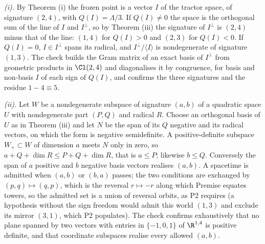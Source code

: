 \emph{(i).} By Theorem (i) the frozen point is a vector $I$ of the tractor space, of signature $(2,4)$, with $Q(I) = \Lambda/3$. If $Q(I) \neq 0$ the space is the orthogonal sum of the line of $I$ and $I^{\perp}$, so by Theorem (iii) the signature of $I^{\perp}$ is $(2,4)$ minus that of the line: $(1,4)$ for $Q(I) > 0$ and $(2,3)$ for $Q(I) < 0$. If $Q(I) = 0$, $I \in I^{\perp}$ spans its radical, and $I^{\perp}/\langle I\rangle$ is nondegenerate of signature $(1,3)$. The check builds the Gram matrix of an exact basis of $I^{\perp}$ from geometric products in $\Cl(2,4)$ and diagonalises it by congruence, for basis and non-basis $I$ of each sign of $Q(I)$, and confirms the three signatures and the residue $1 - 4 \equiv 5$.

\emph{(ii).} Let $W$ be a nondegenerate subspace of signature $(a,b)$ of a quadratic space $U$ with nondegenerate part $(P,Q)$ and radical $R$. Choose an orthogonal basis of $U$ as in Theorem (iii) and let $N$ be the span of its $Q$ negative and its radical vectors, on which the form is negative semidefinite. A positive-definite subspace $W_{+} \subset W$ of dimension $a$ meets $N$ only in zero, so $a + Q + \dim R \le P + Q + \dim R$, that is $a \le P$; likewise $b \le Q$. Conversely the span of $a$ positive and $b$ negative basis vectors realises $(a,b)$. A spacetime is admitted when $(a,b)$ or $(b,a)$ passes; the two conditions are exchanged by $(p,q) \mapsto (q,p)$, which is the reversal $r \mapsto -r$ along which Premise  equates towers, so the admitted set is a union of reversal orbits, as P2 requires (a hypothesis without the sign freedom would admit this world $(1,3)$ and exclude its mirror $(3,1)$, which P2 populates). The check confirms exhaustively that no plane spanned by two vectors with entries in $\{-1, 0, 1\}$ of $\R^{1,4}$ is positive definite, and that coordinate subspaces realise every allowed $(a,b)$.

